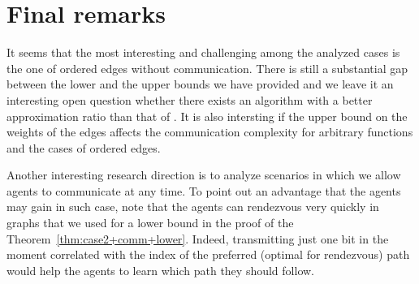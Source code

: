\documentclass{llncs}
\begin{document}
\section{Final remarks}
It seems that the most interesting and challenging among the analyzed cases is the one of ordered edges without communication.
There is still a substantial gap between the lower and the upper bounds we have provided and we leave it an interesting open question whether there exists an algorithm with a better approximation ratio than that of .
It is also intersting if the upper bound  on the weights of the edges affects the communication complexity
for arbitrary functions and the cases of ordered edges.

Another interesting research direction is to analyze scenarios in which we allow agents to communicate at any time. 
To point out an advantage that the agents may gain in such case, note that the agents can rendezvous very quickly in graphs that we used for a lower bound in the proof of the Theorem~\ref{thm:case2+comm+lower}.
Indeed, transmitting just one bit in the moment correlated with the index of the preferred (optimal for rendezvous) path would help the agents to learn which path they should follow.
\end{document}
